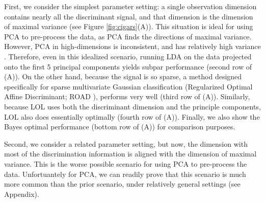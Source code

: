 \documentclass[10pt]{article}
\begin{document}
First, we consider the simplest parameter setting: a single observation dimension contains nearly all the discriminant signal, and that dimension is the dimension of maximal variance (see Figure \ref{fig:cigars}(A)).  This situation is ideal for using PCA to pre-process the data, as PCA finds the directions of maximal variance.  However, PCA in high-dimensions is inconsistent, and has relatively high variance \cite{Cai2012,Fishkind2013a}.  Therefore, even in this idealized scenario, running LDA on the data projected onto the first 5 principal components yields subpar performance (second row of (A)).  On the other hand, because the signal is so sparse, a method designed specifically for sparse multivariate Gaussian classification (Regularized Optimal Affine Discriminant; ROAD \cite{Fan2012}), performs very well (third row of (A)).  Similarly, because LOL uses both the discriminant dimension and the principle components, LOL also does essentially optimally (fourth row of (A)).  Finally, we also show the Bayes optimal performance (bottom row of (A)) for comparison purposes.


Second, we consider a related parameter setting, but now, the dimension with most of the discrimination information is aligned with the dimension of maximal variance.  This is the worse possible scenario for using PCA to pre-process the data.  Unfortuantely for PCA, we can readily prove that this scenario is much more common than the prior scenario, under relatively general settings (see Appendix).







\end{document}

